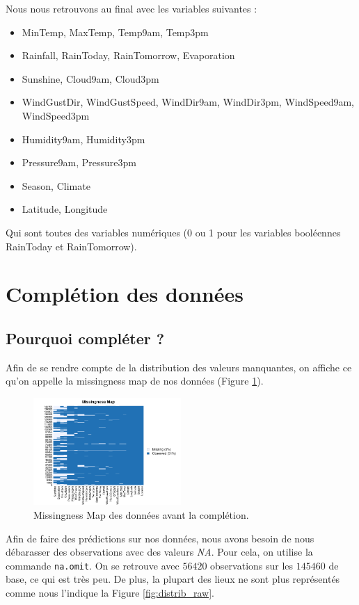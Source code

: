 \documentclass{article}
\begin{document}
Nous nous retrouvons au final avec les variables suivantes : 
\begin{itemize}
    \item MinTemp, MaxTemp, Temp9am, Temp3pm
    \item Rainfall, RainToday, RainTomorrow, Evaporation
    \item Sunshine, Cloud9am, Cloud3pm
    \item WindGustDir, WindGustSpeed, WindDir9am, WindDir3pm, WindSpeed9am, WindSpeed3pm
    \item Humidity9am, Humidity3pm
    \item Pressure9am, Pressure3pm
    \item Season, Climate
    \item Latitude, Longitude
\end{itemize}
Qui sont toutes des variables numériques (0 ou 1 pour les variables booléennes RainToday et RainTomorrow).

\section{Complétion des données}

\subsection{Pourquoi compléter ?}

Afin de se rendre compte de la distribution des valeurs manquantes, on affiche ce qu'on appelle la missingness map de nos données (Figure \ref{fig:missingness_raw}).

\begin{figure}[ht]
    \centering
    \includegraphics[width=0.5\textwidth]{Images/missmap.png}
    \caption{Missingness Map des données avant la complétion.}
    \label{fig:missingness_raw}
\end{figure}

Afin de faire des prédictions sur nos données, nous avons besoin de nous débarasser des observations avec des valeurs \emph{NA}. Pour cela, on utilise la commande \texttt{na.omit}. On se retrouve avec $56420$ observations sur les $145460$ de base, ce qui est très peu. De plus, la plupart des lieux ne sont plus représentés comme nous l'indique la Figure \ref{fig:distrib_raw}.
\end{document}
